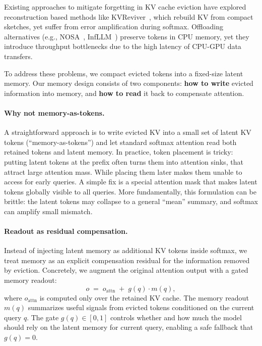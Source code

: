 Existing approaches to mitigate forgetting in KV cache eviction have explored reconstruction based methods like KVReviver~\citep{yuan2025kvreviver}, which rebuild KV from compact sketches, yet suffer from error amplification during softmax. Offloading alternatives (e.g., NOSA~\citep{huang2025nosa}, InfLLM~\citep{xiao2024infllm}) preserve tokens in CPU memory, yet they introduce throughput bottlenecks due to the high latency of CPU-GPU data transfers.


To address these problems, we compact evicted tokens into a fixed-size latent memory. Our memory design consists of two components: \textbf{how to write} evicted information into memory, and \textbf{how to read} it back to compensate attention.

\paragraph{Why not memory-as-tokens.} A straightforward approach is to write evicted KV into a small set of latent KV tokens (``memory-as-tokens'') and let standard softmax attention read both retained tokens and latent memory. In practice, token placement is tricky: putting latent tokens at the prefix often turns them into attention sinks, that attract large attention mass. While placing them later makes them unable to access for early queries. A simple fix is a special attention mask that makes latent tokens globally visible to all queries. More fundamentally, this formulation can be brittle: the latent tokens may collapse to a general ``mean'' summary, and softmax can amplify small mismatch.

\paragraph{Readout as residual compensation.} Instead of injecting latent memory as additional KV tokens inside softmax, we treat memory as an explicit compensation residual for the information removed by eviction. Concretely, we augment the original attention output with a gated memory readout:
\begin{equation}
o \;=\; o_{\mathrm{attn}} \;+\; g(q) \cdot m(q),
\label{eq:latent_residual_fuse}
\end{equation}
where $o_{\mathrm{attn}}$ is computed only over the retained KV cache. The memory readout $m(q)$ summarizes useful signals from evicted tokens conditioned on the current query $q$. The gate $g(q)\in[0,1]$ controls whether and how much the model should rely on the latent memory for current query, enabling a safe fallback that $g(q)=0$.

